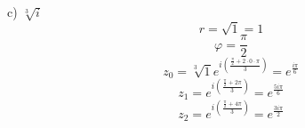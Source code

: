 \documentclass{article}
\begin{document}
    c) $\sqrt[3]{i}$
    \begin{equation*}
        r = \sqrt{1} = 1
    \end{equation*}
    \begin{equation*}
        \varphi = \frac{\pi}{2}
    \end{equation*}
    \begin{equation*}
        z_0 = \sqrt[3]{1}e^{i\left(\frac{\frac{\pi}{2} + 2\cdot0\cdot\pi}{3}\right)} = e^{\frac{i\pi}{6}}
    \end{equation*}
    \begin{equation*}
        z_1 = e^{i\left(\frac{\frac{\pi}{2} + 2\pi}{3}\right)} = e^{\frac{5i\pi}{6}}
    \end{equation*}
    \begin{equation*}
        z_2 = e^{i\left(\frac{\frac{\pi}{2} + 4\pi}{3}\right)} = e^{\frac{3i\pi}{2}}
    \end{equation*}
\end{document}
